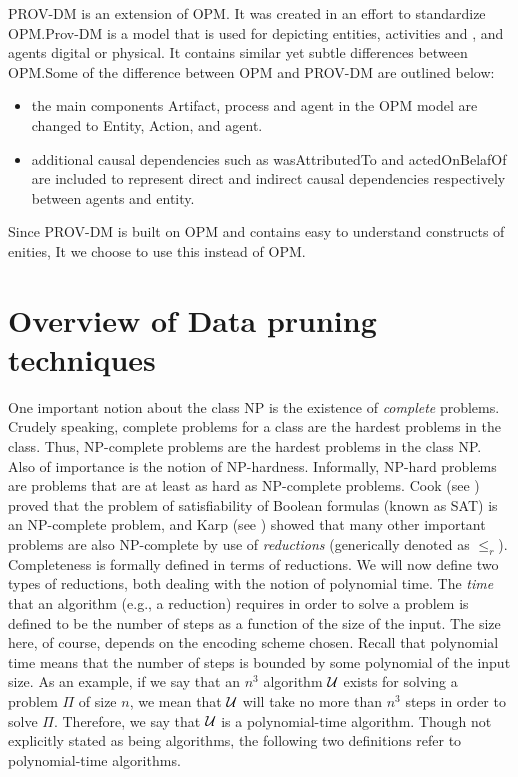 PROV-DM is an extension of OPM. It was created in an effort to standardize OPM.Prov-DM is a model that is used for depicting entities, activities and , and agents digital or physical.  It contains similar yet subtle differences between OPM.Some of the difference between OPM and PROV-DM are outlined below:

\begin{itemize}

\item the main components Artifact, process and agent in the OPM model are changed to Entity, Action, and agent. 

\item additional causal dependencies such as wasAttributedTo and actedOnBelafOf are included to represent direct and indirect causal dependencies respectively between agents and entity.

\end{itemize}



Since PROV-DM is built on OPM and contains easy to understand constructs of enities, It we choose to use this instead of OPM. 


\section{Overview of Data pruning techniques}

One important notion about the class NP is the existence of {\em complete\/}
problems. Crudely speaking, complete problems for a class are the hardest
problems in the class.  Thus, NP-complete problems are the hardest problems
in the class NP.  Also of importance is the notion of NP-hardness.
Informally, NP-hard problems are problems that are at least as hard as
NP-complete problems. Cook (see \cite{Cook1971}) proved that the problem of
satisfiability of Boolean formulas (known as SAT) is an NP-complete problem,
and Karp (see \cite{Karp1972}) showed that many other important problems
are also NP-complete by use of {\em reductions\/} (generically denoted
as $\leq_r$).  Completeness is formally defined in terms of reductions.
We will now define two types of reductions, both dealing with the notion of
polynomial time.  The {\em time\/} that an algorithm (e.g., a reduction)
requires in order to solve a problem is defined to be the number of steps as
a function of the size of the input. The size here, of course, depends on the
encoding scheme chosen. Recall that polynomial time means that the number of
steps is bounded by some polynomial of the input size. As an example, if we
say that an $n^3$ algorithm $\cal U$ exists for solving a problem $\Pi$ of
size $n$, we mean that $\cal U$ will take no more than $n^3$ steps in order
to solve $\Pi$.  Therefore, we say that $\cal U$ is a polynomial-time
algorithm.  Though not explicitly stated as being algorithms, the following
two definitions refer to polynomial-time algorithms.

